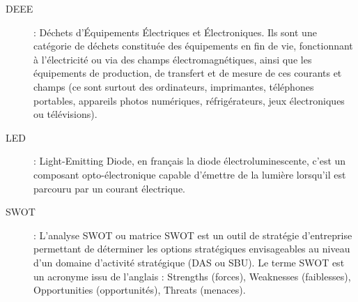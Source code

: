 \begin{description}
\item[DEEE] : Déchets d’Équipements Électriques et Électroniques. Ils sont une catégorie de déchets constituée des équipements en fin de vie, fonctionnant à l'électricité ou via des champs électromagnétiques, ainsi que les équipements de production, de transfert et de mesure de ces courants et champs (ce sont surtout des ordinateurs, imprimantes, téléphones portables, appareils photos numériques, réfrigérateurs, jeux électroniques ou télévisions).

\item[LED] : Light-Emitting Diode, en français la diode électroluminescente, c'est un composant opto-électronique capable d’émettre de la lumière lorsqu’il est parcouru par un courant électrique. %

\item[SWOT] : L’analyse SWOT ou matrice SWOT est un outil de stratégie d'entreprise permettant de déterminer les options stratégiques envisageables au niveau d'un domaine d'activité stratégique (DAS ou SBU). Le terme SWOT est un acronyme issu de l'anglais : Strengths (forces), Weaknesses (faiblesses), Opportunities (opportunités), Threats (menaces).

\end{description}